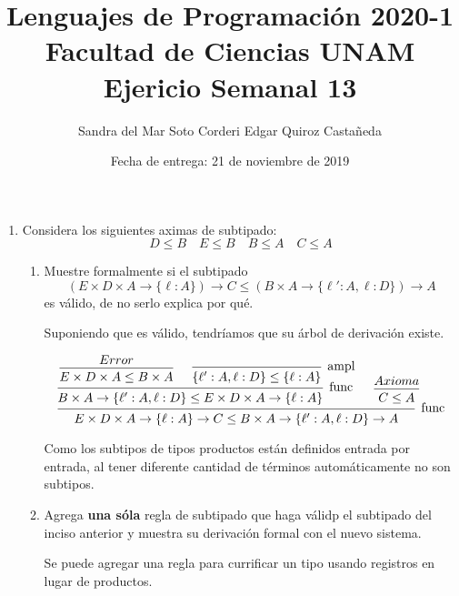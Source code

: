 \documentclass{article}
\title{
    Lenguajes de Programación 2020-1\\
    Facultad de Ciencias UNAM\\
    Ejericio Semanal 13
}
\author{
    Sandra del Mar Soto Corderi \qquad
    Edgar Quiroz Castañeda
}
\date{
    Fecha de entrega: 21 de noviembre de 2019
}
\newcommand{\x}{\times}
\newcommand{\m}{\rightarrow}
\begin{document}
    \maketitle

    \begin{enumerate}
        \item Considera los siguientes aximas de subtipado:
        \[D \leq B \quad E \leq B \quad B \leq A \quad C \leq A\]

        \begin{enumerate}
            \item Muestre formalmente si el subtipado
            \[
                (E \x D \x A \m \{\ell:A\}) \m C \leq 
                (B \x A \m \{\ell':A, \ell:D\}) \m A
            \]
            es válido, de no serlo explica por qué.

            Suponiendo que es válido, tendríamos que su árbol de derivación 
            existe.

            \[
                \begin{prooftree}
                    \hypo{Error}
                    \infer 1 {E \x D \x A \leq  B \x A}

                    \hypo{}
                    \infer 1 [ampl]{\{\ell' : A, \ell : D\} \leq \{\ell : A\}}

                    \infer 2 [func]{
                        B \x A \m \{\ell' : A, \ell : D\} \leq 
                        E \x D \x A \m \{\ell : A\}
                    }

                    \hypo{Axioma}
                    \infer 1 {C \leq A}

                    \infer 2 [func] {
                        E \x D \x A \m \{\ell : A\} \m C \leq
                        B \x A \m \{\ell' : A, \ell : D\} \m A
                    }
                \end{prooftree}
            \]

            Como los subtipos de tipos productos están definidos entrada por
            entrada, al tener diferente cantidad de términos automáticamente no
            son subtipos.

            \item Agrega \textbf{una sóla} regla de subtipado que haga válidp el
            subtipado del inciso anterior y muestra su derivación formal con el 
            nuevo sistema.

            Se puede agregar una regla para currificar un tipo usando
            registros en lugar de productos.


\end{enumerate}
\end{enumerate}
\end{document}
